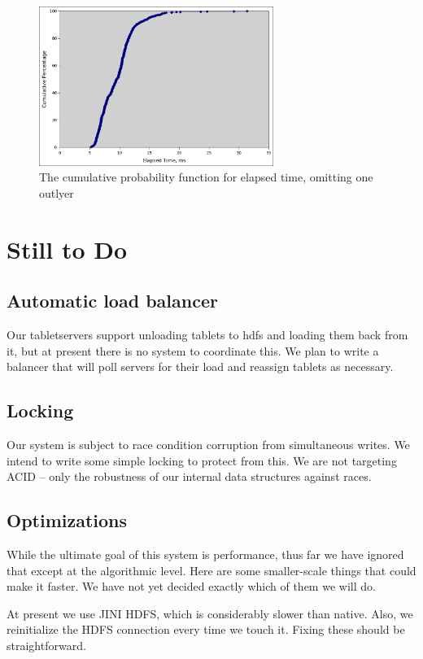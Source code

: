 \documentclass[11pt]{article}
\begin{document}
\begin{figure}[b]
\includegraphics[width=3in]{querytimes}
\caption{The cumulative probability function for elapsed time, omitting one outlyer}
\end{figure}

\section{Still to Do}

\subsection{Automatic load balancer}

Our tabletservers support unloading tablets to hdfs and loading them back from it, but at present there is no system to coordinate this. We plan to write a balancer that will poll servers for their load and reassign tablets as necessary.

\subsection{Locking}

Our system is subject to race condition corruption from simultaneous writes. We intend to write some simple locking to protect from this. We are not targeting ACID -- only the robustness of our internal data structures against races.

\subsection{Optimizations}

While the ultimate goal of this system is performance, thus far we have ignored that except at the algorithmic level. Here are some smaller-scale things that could make it faster. We have not yet decided exactly which of them we will do.


At present we use JINI HDFS, which is considerably slower than native. Also, we reinitialize the HDFS connection every time we touch it. Fixing these should be straightforward.
\end{document}
